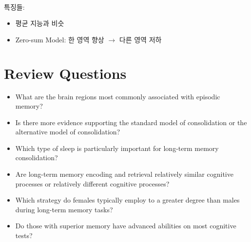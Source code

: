 \documentclass[../note.tex]{subfiles}
\begin{document}
\\

\vspace{1em}
특징들:
\begin{itemize}
  \item 평균 지능과 비슷
  \item Zero-sum Model: 한 영역 향상 $\rightarrow$ 다른 영역 저하
\end{itemize}

\section{Review Questions}
\begin{itemize}
  \item What are the brain regions most commonly associated with episodic
memory?
  \item Is there more evidence supporting the standard model of consolidation or
the alternative model of consolidation?
  \item Which type of sleep is particularly important for long-term memory
consolidation?
  \item Are long-term memory encoding and retrieval relatively similar
cognitive processes or relatively different cognitive processes?
  \item Which strategy do females typically employ to a greater degree than
males during long-term memory tasks?
  \item Do those with superior memory have advanced abilities on most
cognitive tests?
\end{itemize}
\end{document}
